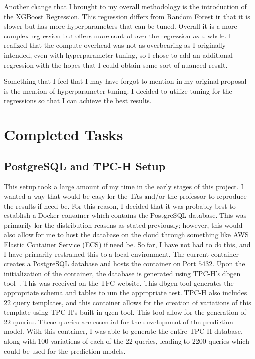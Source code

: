 \documentclass[sigconf]{acmart}
\begin{document}
Another change that I brought to my overall methodology is the introduction of the XGBoost Regression. This regression differs from Random Forest in that
it is slower but has more hyperparameters that can be tuned. Overall it is a more complex regression but offers more control over the regression as a whole.
I realized that the compute overhead was not as overbearing as I originally intended, even with hyperparameter tuning, so I chose to add an additional regression with
the hopes that I could obtain some sort of nuanced result.

Something that I feel that I may have forgot to mention in my original proposal is the mention of hyperparameter tuning. I decided to utilize tuning for 
the regressions so that I can achieve the best results.

\section{Completed Tasks}
\subsection{PostgreSQL and TPC-H Setup}
This setup took a large amount of my time in the early stages of this project. I wanted a way that would be
easy for the TAs and/or the professor to reproduce the results if need be. For this reason, I decided that it was probably
best to establish a Docker container which contains the PostgreSQL database. This was primarily for the distribution reasons
as stated previously; however, this would also allow for me to host the database on the cloud through something like AWS Elastic Container Service (ECS)
if need be. So far, I have not had to do this, and I have primarily restrained this to a local environment. The current container creates a PostgreSQL database
and hosts the container on Port $5432$. Upon the initialization of the container, the database is generated using TPC-H's dbgen tool~\cite{tpch}. This
was received on the TPC website. This dbgen tool generates the appropriate schema and tables to run the appropriate test. TPC-H also includes $22$ query templates,
and this container allows for the creation of variations of this template using TPC-H's built-in qgen tool. This tool allow for the generation of 22 queries. 
These queries are essential for the development of the prediction model. With this container, I was able to generate the entire TPC-H database, along with 100 variations
of each of the 22 queries, leading to 2200 queries which could be used for the prediction models.
\end{document}
